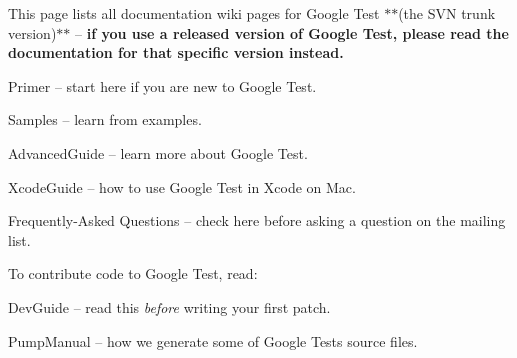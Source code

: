 This page lists all documentation wiki pages for Google Test $\ast$$\ast$(the S\+VN trunk version)$\ast$$\ast$ -- {\bfseries{if you use a released version of Google Test, please read the documentation for that specific version instead.}}


\begin{DoxyItemize}
\item Primer -- start here if you are new to Google Test.
\item Samples -- learn from examples.
\item Advanced\+Guide -- learn more about Google Test.
\item Xcode\+Guide -- how to use Google Test in Xcode on Mac.
\item Frequently-\/\+Asked Questions -- check here before asking a question on the mailing list.
\end{DoxyItemize}

To contribute code to Google Test, read\+:


\begin{DoxyItemize}
\item Dev\+Guide -- read this {\itshape before} writing your first patch.
\item Pump\+Manual -- how we generate some of Google Test\textquotesingle{}s source files. 
\end{DoxyItemize}